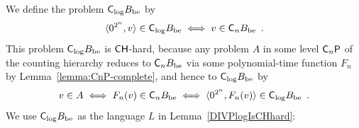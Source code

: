 We define the problem $\mathsf{C}_{\log} B_{\mathrm{be}}$ by
\begin{equation}
\label{equation: definition of padded CQBF}
 \langle 0^{2^n}, v \rangle \in \mathsf{C}_{\log} B_{\mathrm{be}}
 \iff
 v \in \mathsf{C}_n B_{\mathrm{be}} \enspace .
\end{equation}
This problem $\mathsf{C}_{\log} B_{\mathrm{be}}$ is $\mathsf{CH}$-hard, 
because any problem $A$ in some level $\mathsf{C}_n \mathsf{P}$ 
of the counting hierarchy
reduces to $\mathsf{C}_n B_{\mathrm{be}}$ 
via some polynomial-time function $F _n$
by Lemma~\ref{lemma:CnP-complete}, 
and hence to $\mathsf{C}_{\log} B_{\mathrm{be}}$ by 
\begin{equation}
  v \in A 
 \iff
  F_n (v) \in \mathsf{C}_n B_{\mathrm{be}}
 \iff
  \langle 0^{2^n}, F_n (v) \rangle \in \mathsf{C}_{\log} B_{\mathrm{be}} \enspace .
\end{equation}
We use $\mathsf{C}_{\log} B_{\mathrm{be}}$ 
as the language $L$ in Lemma~\ref{DIVPlogIsCHhard}: 

